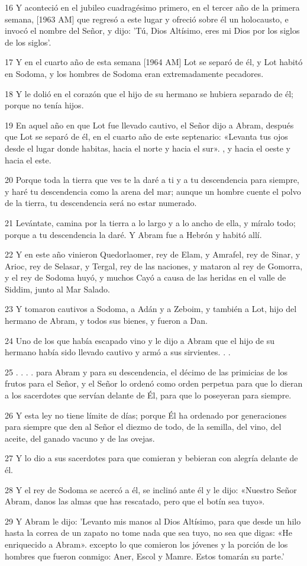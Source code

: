 \par 16 Y aconteció en el jubileo cuadragésimo primero, en el tercer año de la primera semana, [1963 AM] que regresó a este lugar y ofreció sobre él un holocausto, e invocó el nombre del Señor, y dijo: 'Tú, Dios Altísimo, eres mi Dios por los siglos de los siglos'.
\par 17 Y en el cuarto año de esta semana [1964 AM] Lot se separó de él, y Lot habitó en Sodoma, y ​​los hombres de Sodoma eran extremadamente pecadores.
\par 18 Y le dolió en el corazón que el hijo de su hermano se hubiera separado de él; porque no tenía hijos.
\par 19 En aquel año en que Lot fue llevado cautivo, el Señor dijo a Abram, después que Lot se separó de él, en el cuarto año de este septenario: «Levanta tus ojos desde el lugar donde habitas, hacia el norte y hacia el sur». , y hacia el oeste y hacia el este.
\par 20 Porque toda la tierra que ves te la daré a ti y a tu descendencia para siempre, y haré tu descendencia como la arena del mar; aunque un hombre cuente el polvo de la tierra, tu descendencia será no estar numerado.
\par 21 Levántate, camina por la tierra a lo largo y a lo ancho de ella, y míralo todo; porque a tu descendencia la daré. Y Abram fue a Hebrón y habitó allí.
\par 22 Y en este año vinieron Quedorlaomer, rey de Elam, y Amrafel, rey de Sinar, y Arioc, rey de Selasar, y Tergal, rey de las naciones, y mataron al rey de Gomorra, y el rey de Sodoma huyó, y muchos Cayó a causa de las heridas en el valle de Siddim, junto al Mar Salado.
\par 23 Y tomaron cautivos a Sodoma, a Adán y a Zeboim, y también a Lot, hijo del hermano de Abram, y todos sus bienes, y fueron a Dan.
\par 24 Uno de los que había escapado vino y le dijo a Abram que el hijo de su hermano había sido llevado cautivo y armó a sus sirvientes. . .
\par 25 . . . . para Abram y para su descendencia, el décimo de las primicias de los frutos para el Señor, y el Señor lo ordenó como orden perpetua para que lo dieran a los sacerdotes que servían delante de Él, para que lo poseyeran para siempre.
\par 26 Y esta ley no tiene límite de días; porque Él ha ordenado por generaciones para siempre que den al Señor el diezmo de todo, de la semilla, del vino, del aceite, del ganado vacuno y de las ovejas.
\par 27 Y lo dio a sus sacerdotes para que comieran y bebieran con alegría delante de él.
\par 28 Y el rey de Sodoma se acercó a él, se inclinó ante él y le dijo: «Nuestro Señor Abram, danos las almas que has rescatado, pero que el botín sea tuyo».
\par 29 Y Abram le dijo: 'Levanto mis manos al Dios Altísimo, para que desde un hilo hasta la correa de un zapato no tome nada que sea tuyo, no sea que digas: «He enriquecido a Abram». excepto lo que comieron los jóvenes y la porción de los hombres que fueron conmigo: Aner, Escol y Mamre. Estos tomarán su parte.'

